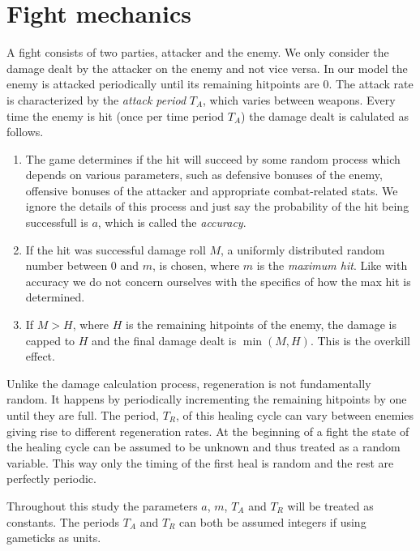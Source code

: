 \section{Fight mechanics}\label{chap:fightMechanics}
A fight consists of two parties, attacker and the enemy. We only consider the damage dealt by the attacker on the enemy and not vice versa. In our model the enemy is attacked periodically until its remaining hitpoints are 0. The attack rate is characterized by the \textit{attack period} $T_A$, which varies between weapons.
Every time the enemy is hit (once per time period $T_A$) the damage dealt is calulated as follows.
\begin{enumerate}
	\item The game determines if the hit will succeed by some random process which depends on various parameters, such as defensive bonuses of the enemy, offensive bonuses of the attacker and appropriate combat-related stats. We ignore the details of this process and just say the probability of the hit being successfull is $a$, which is called the \textit{accuracy}.
    \item If the hit was successful damage roll $M$, a uniformly distributed random number between 0 and $m$, is chosen, where $m$ is the \textit{maximum hit}. Like with accuracy we do not concern ourselves with the specifics of how the max hit is determined.
    \item If $M > H$, where $H$ is the remaining hitpoints of the enemy, the damage is capped to $H$ and the final damage dealt is $\min(M,H)$. This is the overkill effect.
\end{enumerate}

Unlike the damage calculation process, regeneration is not fundamentally random. It happens by periodically incrementing the remaining hitpoints by one until they are full. The period, $T_R$, of this healing cycle can vary between enemies giving rise to different regeneration rates. At the beginning of a fight the state of the healing cycle can be assumed to be unknown and thus treated as a random variable. This way only the timing of the first heal is random and the rest are perfectly periodic.

Throughout this study the parameters $a$, $m$, $T_A$ and $T_R$ will be treated as constants. The periods $T_A$ and $T_R$ can both be assumed integers if using gameticks as units.
